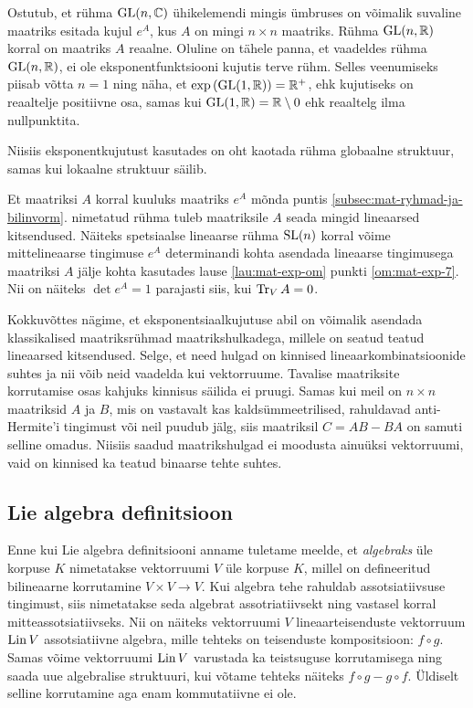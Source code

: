 Ostutub, et rühma $\operatorname{GL}(n, \mathbb{C})$ ühikelemendi mingis ümbruses on võimalik
suvaline maatriks esitada kujul $e^A$, kus $A$ on mingi $n \times n$
maatriks. Rühma $\operatorname{GL}(n, \mathbb{R})$ korral on maatriks $A$ reaalne. Oluline on
tähele panna, et vaadeldes rühma $\operatorname{GL}(n, \mathbb{R})$, ei ole eksponentfunktsiooni
kujutis terve rühm. Selles veenumiseks piisab võtta $n = 1$ ning näha, et
$\exp \left(\operatorname{GL}(1, \mathbb{R})\right) = \mathbb{R}^+$, ehk kujutiseks on reaaltelje positiivne
osa, samas kui $\operatorname{GL}(1, \mathbb{R}) = \mathbb{R} \setminus {0}$ ehk reaaltelg ilma nullpunktita.

Niisiis eksponentkujutust kasutades on oht kaotada rühma globaalne struktuur,
samas kui lokaalne struktuur säilib.

Et maatriksi $A$ korral kuuluks maatriks $e^A$ mõnda puntis
\ref{subsec:mat-ryhmad-ja-bilinvorm}.  nimetatud rühma tuleb maatriksile
$A$ seada mingid lineaarsed kitsendused. Näiteks spetsiaalse lineaarse rühma
$\operatorname{SL}(n)$ korral võime mittelineaarse tingimuse $e^A$ determinandi kohta
asendada lineaarse tingimusega maatriksi $A$ jälje kohta kasutades lause
\ref{lau:mat-exp-om} punkti \ref{om:mat-exp-7}. Nii on näiteks
$\det e^A = 1$ parajasti siis, kui $\operatorname{Tr}_V A = 0$.

Kokkuvõttes nägime, et eksponentsiaalkujutuse abil on võimalik asendada
klassikalised maatriksrühmad maatrikshulkadega, millele on seatud
teatud lineaarsed kitsendused. Selge, et need hulgad on kinnised
lineaarkombinatsioonide suhtes ja nii võib neid vaadelda kui vektorruume.
Tavalise maatriksite korrutamise osas kahjuks kinnisus säilida ei
pruugi. Samas kui meil on $n \times n$ maatriksid $A$ ja $B$, mis on vastavalt
kas kaldsümmeetrilised, rahuldavad anti-Hermite'i tingimust või neil
puudub jälg, siis maatriksil $C = AB - BA$ on samuti selline omadus.
Niisiis saadud maatrikshulgad ei moodusta ainuüksi vektorruumi,
vaid on kinnised ka teatud binaarse tehte suhtes.

\subsection{Lie algebra definitsioon}

Enne kui Lie algebra definitsiooni anname tuletame meelde, et \emph{algebraks}
üle korpuse $K$ nimetatakse vektorruumi $V$ üle korpuse $K$, millel on
defineeritud bilineaarne korrutamine $V \times V \to V$. Kui algebra
tehe rahuldab assotsiatiivsuse tingimust, siis nimetatakse seda algebrat
assotriatiivsekt ning vastasel korral mitteassotsiatiivseks. Nii on näiteks
vektorruumi $V$ lineaarteisenduste vektorruum $\operatorname{Lin} V$ assotsiatiivne algebra,
mille tehteks on teisenduste kompositsioon: $f \circ g$. Samas võime
vektorruumi $\operatorname{Lin} V$ varustada ka teistsuguse korrutamisega ning saada uue
algebralise struktuuri, kui võtame tehteks näiteks $f \circ g - g \circ f$.
Üldiselt selline korrutamine aga enam kommutatiivne ei ole.

